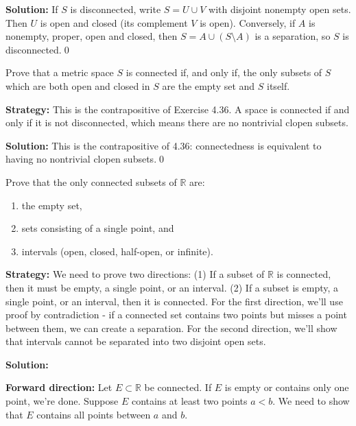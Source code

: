 \bigskip\noindent\textbf{Solution:}
If $S$ is disconnected, write $S=U\cup V$ with disjoint nonempty open sets. Then $U$ is open and closed (its complement $V$ is open). Conversely, if $A$ is nonempty, proper, open and closed, then $S=A\cup(S\setminus A)$ is a separation, so $S$ is disconnected.\qed



\begin{problembox}
Prove that a metric space $S$ is connected if, and only if, the only subsets of $S$ which are both open and closed in $S$ are the empty set and $S$ itself.
\end{problembox}

\noindent\textbf{Strategy:} This is the contrapositive of Exercise 4.36. A space is connected if and only if it is not disconnected, which means there are no nontrivial clopen subsets.

\bigskip\noindent\textbf{Solution:}
This is the contrapositive of 4.36: connectedness is equivalent to having no nontrivial clopen subsets.\qed



\begin{problembox}
Prove that the only connected subsets of $\mathbb{R}$ are:
\begin{enumerate}[label=(\alph*)]
\item the empty set,
\item sets consisting of a single point, and
\item intervals (open, closed, half-open, or infinite).
\end{enumerate}
\end{problembox}

\noindent\textbf{Strategy:} We need to prove two directions: (1) If a subset of $\mathbb{R}$ is connected, then it must be empty, a single point, or an interval. (2) If a subset is empty, a single point, or an interval, then it is connected. For the first direction, we'll use proof by contradiction - if a connected set contains two points but misses a point between them, we can create a separation. For the second direction, we'll show that intervals cannot be separated into two disjoint open sets.

\bigskip\noindent\textbf{Solution:}

\textbf{Forward direction:} Let $E \subset \mathbb{R}$ be connected. If $E$ is empty or contains only one point, we're done. Suppose $E$ contains at least two points $a < b$. We need to show that $E$ contains all points between $a$ and $b$.

